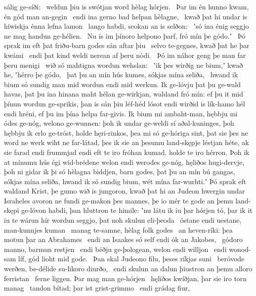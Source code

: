sálig ge-síði: \hld\ weldun þiu is swótjan word
hèlag hórjen. \hld\ Þar im én hunno kwam,
én gód man an-gegin \hld\ endi ina gerno bad
helpan hèlagne, \hld\ kwað þat hi undar is híwiskja
énna lefna lamon \hld\ lango habdi,
seokan an is selðon: \hld\ ʽsó ina énig seggjo ne mag
handun ge-hélien. \hld\ Nu is im þínoro helpono þarf,
fró mín þe gódo.ʼ \hld\ Þó sprak im eft þat friðu-barn godes
sán aftar þiu \hld\ selvo te-gegnes,
kwað þat he þar kwámi \hld\ endi þat kind weldi
nerean af þeru nòdi. \hld\ Þó im náhor geng
þe man far þeru menigi \hld\ wið só mahtigna
wordun wehslan: \hld\ ʽik þes wirðig ne bium,ʼ kwað he,
ʽhérro þe gódo, \hld\ þat þu an mín hús kumes,
sókjas mína seliða, \hld\ hwand ik bium só sundig man
mid wordun endi mid werkun. \hld\ Ik ge-lóvju þat þu ge-wald havas,
þat þu ina hinana maht \hld\ hélan ge-wirkjan,
waldand fró mín: \hld\ ef þu it mid þínun wordun ge-sprikis,
þan is sán þiu léf-héd lósot \hld\ endi wirðid is lík-hamo
hél endi hréni, \hld\ ef þu im þína helpa far-givis.
Ik bium mi ambaht-man, \hld\ hębbju mi ódes ge-nóg,
welono ge-wunnen: \hld\ þoh ik undar ge-weldi sí
aðal-kuninges, \hld\ þoh hębbju ik erlo ge-tróst,
holde hęri-rinkos, \hld\ þea mi só ge-hóriga sint,
þat sie þes ne word ne werk \hld\ wiht ne far-látad,
þes ik sie an þesumu land-skępje \hld\ léstjan héte,
ak sie farad endi frummjad \hld\ endi eft te iro fróhan kumad,
holde te iro hérron. \hld\ Þoh ik at mínumu hús égi
wíd-brédene welon \hld\ endi werodes ge-nóg,
hęliðos hugi-dervje, \hld\ þoh ni gidar ik þi só hèlagna
biddjen, barn godes, \hld\ þat þu an mín bú gangas,
sókjas mína seliða, \hld\ hwand ik só sundig bium,
wét mína far-wurhti.ʼ \hld\ Þó sprak eft waldand Krist,
þe gumo wið is jungoron, \hld\ kwað þat hi an Judeon hwergin
undar Israheles \hld\ avoron ne fundi
ge-makon þes mannes, \hld\ þe io mér te gode
an þemu land-skępi \hld\ ge-lóvon habdi,
þan hluttron te himile: \hld\ ʽnu látu ik iu þar hórjen tó,
þar ik it iu te wárun hír \hld\ wordun seggjo,
þat noh skulun eli-þeoda \hld\ óstane endi uestane,
man-kunnjes kuman \hld\ manag te-samne,
hèlag folk godes \hld\ an heven-ríki:
þea motun þar an Abrahames \hld\ endi an Isaakes só self
endi ók an Jakobes, \hld\ gódoro manno,
barmun restjen \hld\ endi béðju ge-þologean,
welon endi willjon \hld\ endi wonod-sam líf,
gód lioht mid gode. \hld\ Þan skal Judeono filu,
þeses ríkjas suni \hld\ beróvode werðen,
be-délide su-likoro diurðo, \hld\ endi skulun an dalun þiustron
an þemu alloro ferristan \hld\ ferne liggen.
Þar mag man ge-hórjen \hld\ hęliðos kwíðjan,
þar sie iro torn manag \hld\ tandon bítad;
þar ist grist-grimmo \hld\ endi grádag fiur,
